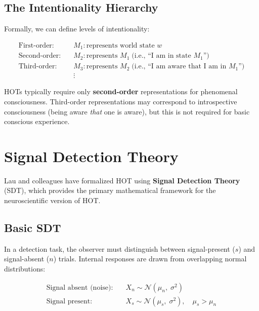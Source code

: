 \documentclass[11pt,a4paper]{report}
\begin{document}
\subsection{The Intentionality Hierarchy}

Formally, we can define levels of intentionality:

\begin{mathbox}
\vspace{-6pt}
\begin{align*}
  \text{First-order:}\quad & M_1 : \text{represents world state } w \\
  \text{Second-order:}\quad & M_2 : \text{represents } M_1 \;\text{(i.e., ``I am in state } M_1\text{'')} \\
  \text{Third-order:}\quad & M_3 : \text{represents } M_2 \;\text{(i.e., ``I am aware that I am in } M_1\text{'')} \\
  & \vdots
\end{align*}
\vspace{-8pt}
\end{mathbox}

HOTs typically require only \textbf{second-order} representations for phenomenal consciousness. Third-order representations may correspond to introspective consciousness (being aware \emph{that} one is aware), but this is not required for basic conscious experience.

\section{Signal Detection Theory}

Lau and colleagues have formalized HOT using \textbf{Signal Detection Theory} (SDT), which provides the primary mathematical framework for the neuroscientific version of HOT.

\subsection{Basic SDT}

In a detection task, the observer must distinguish between signal-present ($s$) and signal-absent ($n$) trials. Internal responses are drawn from overlapping normal distributions:

\begin{mathbox}
\vspace{-6pt}
\begin{align}
  \text{Signal absent (noise):}\quad & X_n \sim \mathcal{N}(\mu_n,\; \sigma^2) \\
  \text{Signal present:}\quad & X_s \sim \mathcal{N}(\mu_s,\; \sigma^2), \quad \mu_s > \mu_n
\end{align}
\vspace{-8pt}
\end{mathbox}
\end{document}
